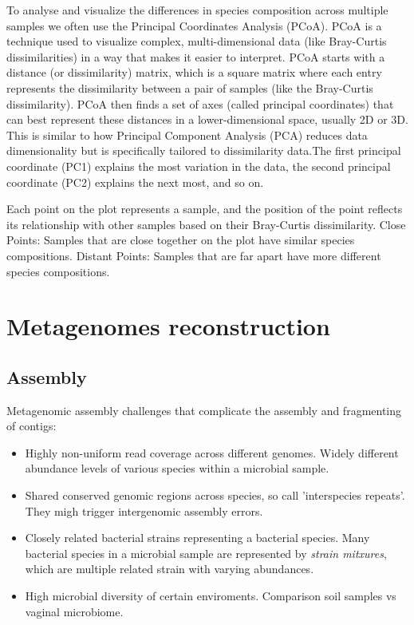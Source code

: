 To analyse and visualize the differences in species composition across multiple samples we often use the 
Principal Coordinates Analysis (PCoA). PCoA is a technique used to visualize complex, multi-dimensional data 
(like Bray-Curtis dissimilarities) in a way that makes it easier to interpret. PCoA starts with a distance 
(or dissimilarity) matrix, which is a square matrix where each entry represents the dissimilarity between a pair of 
samples (like the Bray-Curtis dissimilarity). PCoA then finds a set of axes (called principal coordinates) that can 
best represent these distances in a lower-dimensional space, usually 2D or 3D. This is similar to how Principal 
Component Analysis (PCA) reduces data dimensionality but is specifically tailored to dissimilarity data.The first 
principal coordinate (PC1) explains the most variation in the data, the second principal coordinate (PC2) explains the 
next most, and so on.

Each point on the plot represents a sample, and the position of the point reflects its relationship with other samples 
based on their Bray-Curtis dissimilarity.
Close Points: Samples that are close together on the plot have similar species compositions.
Distant Points: Samples that are far apart have more different species compositions.

\section{Metagenomes reconstruction}
\subsection{Assembly}

Metagenomic assembly challenges that complicate the assembly and fragmenting of contigs:
\begin{itemize}
    \item Highly non-uniform read coverage across different genomes. Widely different abundance levels of various species 
        within a microbial sample.
    \item Shared conserved genomic regions across species, so call 'interspecies repeats'. They migh trigger intergenomic 
        assembly errors.
    \item Closely related bacterial strains representing a bacterial species. Many bacterial species in a microbial sample 
        are represented by \textit{strain mitxures}, which are multiple related strain with varying abundances.
    \item High microbial diversity of certain enviroments. Comparison soil samples vs vaginal microbiome.
\end{itemize}

